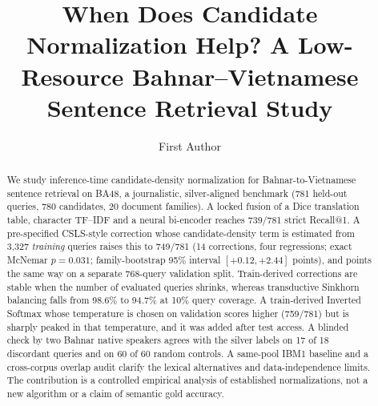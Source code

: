 \documentclass[runningheads]{llncs}
\begin{document}
\title{When Does Candidate Normalization Help? A Low-Resource Bahnar--Vietnamese Sentence Retrieval Study}
\author{First Author}
\maketitle
\begin{abstract}
We study inference-time candidate-density normalization for Bahnar-to-Vietnamese sentence retrieval on BA48, a journalistic, silver-aligned benchmark (781 held-out queries, 780 candidates, 20 document families). A locked fusion of a Dice translation table, character TF--IDF and a neural bi-encoder reaches 739/781 strict Recall@1. A pre-specified CSLS-style correction whose candidate-density term is estimated from 3,327 \emph{training} queries raises this to 749/781 (14 corrections, four regressions; exact McNemar $p=0.031$; family-bootstrap 95\% interval $[+0.12,+2.44]$ points), and points the same way on a separate 768-query validation split. Train-derived corrections are stable when the number of evaluated queries shrinks, whereas transductive Sinkhorn balancing falls from 98.6\% to 94.7\% at 10\% query coverage. A train-derived Inverted Softmax whose temperature is chosen on validation scores higher (759/781) but is sharply peaked in that temperature, and it was added after test access. A blinded check by two Bahnar native speakers agrees with the silver labels on 17 of 18 discordant queries and on 60 of 60 random controls. A same-pool IBM1 baseline and a cross-corpus overlap audit clarify the lexical alternatives and data-independence limits. The contribution is a controlled empirical analysis of established normalizations, not a new algorithm or a claim of semantic gold accuracy.
\end{abstract}









\appendix

\end{document}

